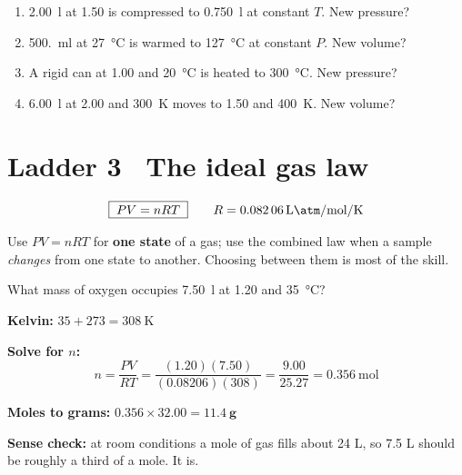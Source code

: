 \documentclass{apchem-worksheet}
\begin{document}
\begin{yourturn}
\begin{enumerate}[leftmargin=*,itemsep=0.5em]
  \item \SI{2.00}{\litre} at \SI{1.50}{\atm} is compressed to
        \SI{0.750}{\litre} at constant $T$. New pressure?
        \workspace[1.4cm]
  \item \SI{500.}{\milli\litre} at \SI{27}{\celsius} is warmed to
        \SI{127}{\celsius} at constant $P$. New volume? \workspace[1.6cm]
  \item A rigid can at \SI{1.00}{\atm} and \SI{20}{\celsius} is heated to
        \SI{300}{\celsius}. New pressure? \workspace[1.6cm]
  \item \SI{6.00}{\litre} at \SI{2.00}{\atm} and \SI{300}{\kelvin} moves
        to \SI{1.50}{\atm} and \SI{400}{\kelvin}. New volume?
        \workspace[1.8cm]
\end{enumerate}
\end{yourturn}

\section*{\sffamily Ladder 3 \textbullet\ The ideal gas law}

\[ \boxed{\;PV = nRT\;} \qquad
   R = \SI{0.08206}{\litre\atm\per\mole\per\kelvin} \]

Use $PV = nRT$ for \textbf{one state} of a gas; use the combined law when
a sample \emph{changes} from one state to another. Choosing between them
is most of the skill.

\begin{workedexample}
What mass of oxygen occupies \SI{7.50}{\litre} at \SI{1.20}{\atm} and
\SI{35}{\celsius}?

\textbf{Kelvin:} $35 + 273 = \SI{308}{\kelvin}$

\textbf{Solve for $n$:}
\[ n = \frac{PV}{RT} = \frac{(1.20)(7.50)}{(0.08206)(308)}
     = \frac{9.00}{25.27} = \SI{0.356}{\mole} \]

\textbf{Moles to grams:} $0.356 \times 32.00 = \mathbf{11.4~g}$

\textbf{Sense check:} at room conditions a mole of gas fills about 24 L,
so 7.5 L should be roughly a third of a mole. It is.
\end{workedexample}
\end{document}
